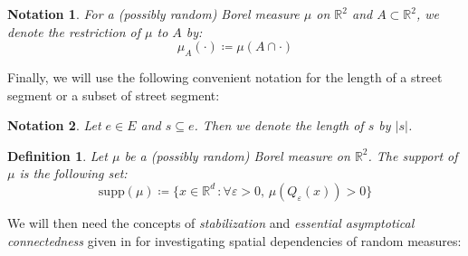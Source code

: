 \documentclass[10pt,a4paper]{amsart}
\theoremstyle{exampstyle}
\newtheorem{Definition}{Definition}
\theoremstyle{exampnotations}
\newtheorem{Notation}{Notation}
\begin{document}
\begin{Notation}
For a (possibly random) Borel measure $\mu$ on $\mathbb{R}^{2}$ and $A \subset \mathbb{R}^{2}$, we denote the restriction of $\mu$ to $A$ by: $$\mu_A(\cdot) \coloneqq \mu(A \cap \cdot)$$
\end{Notation}

Finally, we will use the following convenient notation for the length of a street segment or a subset of street segment:
\begin{Notation}
Let $e \in E$ and $s \subseteq e$. Then we denote the length of $s$ by $\vert s \vert$.
\end{Notation}

\begin{Definition}
Let $\mu$ be a (possibly random) Borel measure on $\mathbb{R}^{2}$. The \emph{support} of $\mu$ is the following set:
$$\text{supp}(\mu) \coloneqq \lbrace x \in \mathbb{R}^{d} \, : \forall \varepsilon > 0, \,  \mu(Q_{\varepsilon}(x)) > 0 \rbrace$$
\end{Definition}
We will then need the concepts of \emph{stabilization} and \emph{essential asymptotical connectedness} given in \cite{hirsch_continuum_2017} for investigating spatial dependencies of random measures:
\end{document}
